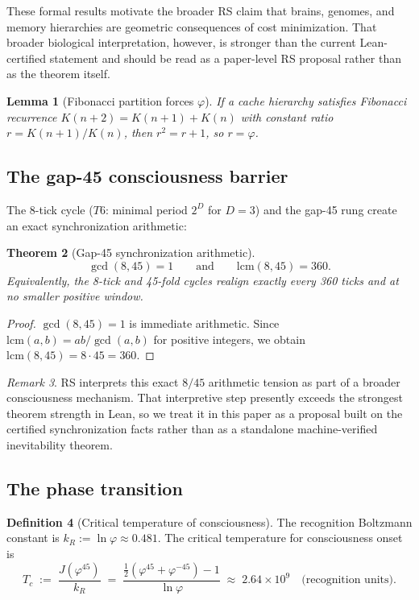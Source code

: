 \documentclass[11pt,a4paper]{article}
\theoremstyle{plain}
\newtheorem{theorem}{Theorem}[section]
\newtheorem{lemma}[theorem]{Lemma}
\theoremstyle{definition}
\newtheorem{definition}[theorem]{Definition}
\theoremstyle{remark}
\newtheorem{remark}[theorem]{Remark}
\newcommand{\Jcost}{J}
\newcommand{\vp}{\varphi}
\begin{document}
These formal results motivate the broader RS claim that brains, genomes,
and memory hierarchies are geometric consequences of cost minimization.
That broader biological interpretation, however, is stronger than the
current Lean-certified statement and should be read as a paper-level RS
proposal rather than as the theorem itself.

\begin{lemma}[Fibonacci partition forces $\vp$]
\label{lem:fibonacci}
If a cache hierarchy satisfies Fibonacci recurrence $K(n+2) =
K(n+1) + K(n)$ with constant ratio $r = K(n+1)/K(n)$, then
$r^2 = r + 1$, so $r = \vp$.
\end{lemma}

\subsection{The gap-45 consciousness barrier}

The 8-tick cycle ($T6$: minimal period $2^D$ for $D = 3$) and the
gap-45 rung create an exact synchronization arithmetic:

\begin{theorem}[Gap-45 synchronization arithmetic]
\label{thm:gap45}
\[
\gcd(8,45)=1 \qquad\text{and}\qquad \mathrm{lcm}(8,45)=360.
\]
Equivalently, the 8-tick and 45-fold cycles realign exactly every
360 ticks and at no smaller positive window.
\end{theorem}

\begin{proof}
$\gcd(8,45)=1$ is immediate arithmetic.  Since
$\mathrm{lcm}(a,b)=ab/\gcd(a,b)$ for positive integers, we obtain
$\mathrm{lcm}(8,45)=8\cdot 45=360$.
\end{proof}

\begin{remark}
RS interprets this exact $8/45$ arithmetic tension as part of a broader
consciousness mechanism.  That interpretive step presently exceeds the
strongest theorem strength in Lean, so we treat it in this paper as a
proposal built on the certified synchronization facts rather than as a
standalone machine-verified inevitability theorem.
\end{remark}

\subsection{The phase transition}

\begin{definition}[Critical temperature of consciousness]
\label{def:Tc}
The recognition Boltzmann constant is $k_R := \ln\vp \approx 0.481$.
The critical temperature for consciousness onset is
\begin{equation}
  T_c \;:=\; \frac{\Jcost(\vp^{45})}{k_R}
  \;=\; \frac{\tfrac{1}{2}(\vp^{45} + \vp^{-45}) - 1}{\ln\vp}
  \;\approx\; 2.64 \times 10^9
  \quad\text{(recognition units)}.
\end{equation}
\end{definition}
\end{document}
